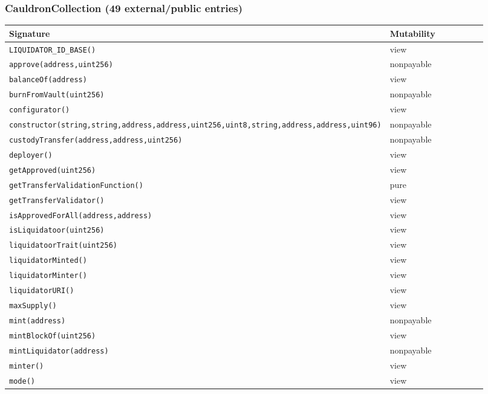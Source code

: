 \subsubsection*{CauldronCollection \;\normalfont\small(49 external/public entries)}
\begin{longtable}{@{}p{0.62\linewidth}p{0.30\linewidth}@{}}
\toprule \textbf{Signature} & \textbf{Mutability} \\ \midrule \endhead
\texttt{\scriptsize LIQUIDATOR\_ID\_BASE()} & view \\
\texttt{\scriptsize approve(address,uint256)} & nonpayable \\
\texttt{\scriptsize balanceOf(address)} & view \\
\texttt{\scriptsize burnFromVault(uint256)} & nonpayable \\
\texttt{\scriptsize configurator()} & view \\
\texttt{\scriptsize constructor(string,string,address,address,uint256,uint8,string,address,address,uint96)} & nonpayable \\
\texttt{\scriptsize custodyTransfer(address,address,uint256)} & nonpayable \\
\texttt{\scriptsize deployer()} & view \\
\texttt{\scriptsize getApproved(uint256)} & view \\
\texttt{\scriptsize getTransferValidationFunction()} & pure \\
\texttt{\scriptsize getTransferValidator()} & view \\
\texttt{\scriptsize isApprovedForAll(address,address)} & view \\
\texttt{\scriptsize isLiquidatoor(uint256)} & view \\
\texttt{\scriptsize liquidatoorTrait(uint256)} & view \\
\texttt{\scriptsize liquidatorMinted()} & view \\
\texttt{\scriptsize liquidatorMinter()} & view \\
\texttt{\scriptsize liquidatorURI()} & view \\
\texttt{\scriptsize maxSupply()} & view \\
\texttt{\scriptsize mint(address)} & nonpayable \\
\texttt{\scriptsize mintBlockOf(uint256)} & view \\
\texttt{\scriptsize mintLiquidator(address)} & nonpayable \\
\texttt{\scriptsize minter()} & view \\
\texttt{\scriptsize mode()} & view \\

\end{longtable}
